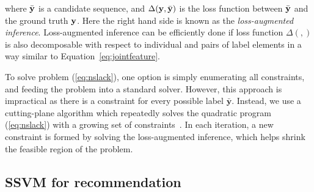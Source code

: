 where $\bar{\mathbf{y}}$ is a candidate sequence,  %
and $\Delta(\mathbf{y}, \bar{\mathbf{y}})$ is the loss function between $\bar{\mathbf{y}}$ and the ground truth $\mathbf{y}$. 
Here the right hand side is known as the \emph{loss-augmented inference}. 
Loss-augmented inference can be efficiently done if loss function $\Delta(,)$ is also decomposable 
with respect to individual and pairs of label elements in a way similar to Equation~\eqref{eq:jointfeature}.



To solve problem (\ref{eq:nslack}), one option is simply enumerating all constraints, and feeding the problem into a standard solver.
However, this approach is impractical as there is a constraint for every possible label $\bar{\mathbf{y}}$.
Instead, we use a cutting-plane algorithm which repeatedly solves the quadratic program (\ref{eq:nslack}) 
with a growing set of constraints~\cite{joachims2009predicting}.
In each iteration, a new constraint is formed by solving the loss-augmented inference, 
which helps shrink the feasible region of the problem.


\subsection{SSVM for recommendation}
\label{ssec:sr}


